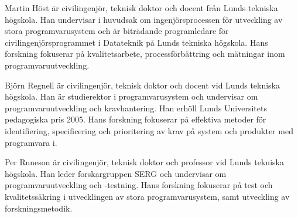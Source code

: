 Martin Höst är civilingenjör, teknisk doktor och docent från Lunds
tekniska högskola. Han undervisar i huvudsak om ingenjörsprocessen för
utveckling av stora programvarusystem och är biträdande programledare
för civilingenjörsprogrammet i Datateknik på Lunds tekniska högskola.
Hans forskning fokuserar på kvalitetsarbete, processförbättring och
mätningar inom programvaruutveckling.

Björn Regnell är civilingenjör, teknisk doktor och docent vid Lunds
tekniska högskola. Han är studierektor i programvarusystem och
undervisar om programvaruutveckling och kravhantering. Han erhöll Lunds
Universitets pedagogiska pris 2005. Hans forskning fokuserar på
effektiva metoder för identifiering, specificering och prioritering av
krav på system och produkter med programvara i.

Per Runeson är civilingenjör, teknisk doktor och professor vid Lunds
tekniska högskola. Han leder forskargruppen SERG och undervisar om
programvaruutveckling och -testning. Hans forskning fokuserar på test
och kvalitetssäkring i utvecklingen av stora programvarusystem, samt
utveckling av forskningsmetodik.
